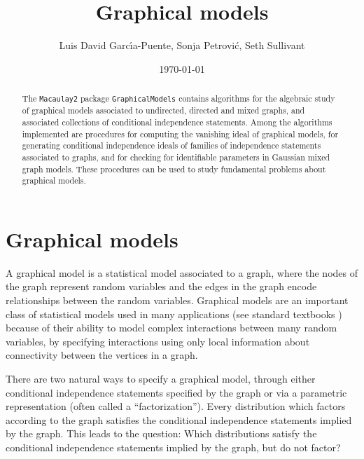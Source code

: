 \documentclass[letterpaper]{article}
\title{Graphical models}
\author{Luis David Garc\'{\i}a-Puente, Sonja Petrovi\'c, Seth Sullivant}
\date{\today}
\theoremstyle{definition}
\begin{document}
\maketitle


\begin{abstract}
The {\tt Macaulay2} package {\tt GraphicalModels} contains algorithms 
for the algebraic study of graphical models associated to undirected, 
directed and mixed graphs, 
and associated collections of 
conditional independence statements. 
Among the algorithms implemented are procedures for computing
the vanishing ideal of graphical models, for generating
conditional independence ideals of families of independence statements
associated to graphs, and for checking for identifiable parameters
in Gaussian mixed graph models.
These procedures can be used to study fundamental 
problems about graphical models. 
\end{abstract}


\section{Graphical models}\label{intro}

A graphical model is a statistical model associated to a graph,
where the nodes of the graph represent random variables and the
edges in the graph encode relationships between the random variables.
Graphical models are an important class of statistical models used
in many applications (see standard textbooks \cite{Lauritzen, Whitaker})
because of their ability to model complex interactions between
many random variables, by specifying
interactions using only local information about connectivity
between the vertices in a graph.

There are two natural ways to specify a graphical model, through 
either conditional independence statements specified by the graph
or via a parametric representation (often called a ``factorization'').
Every distribution which factors according to the graph
satisfies the conditional independence statements implied by the 
graph. This leads to the question:  Which distributions satisfy the conditional
independence statements implied by the graph, but do not factor?
\end{document}
